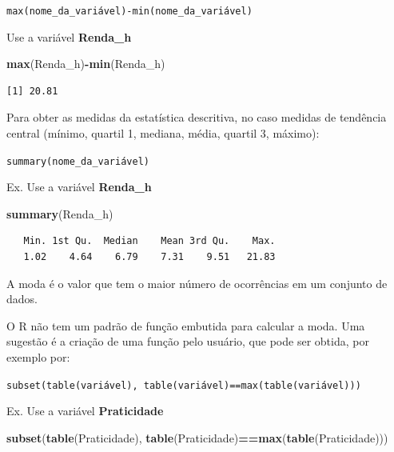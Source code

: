 \documentclass[12pt,brazil,oneside]{book}
\newenvironment{Shaded}{\begin{snugshade}}{\end{snugshade}}
\newcommand{\KeywordTok}[1]{\textcolor[rgb]{0.13,0.29,0.53}{\textbf{#1}}}
\newcommand{\NormalTok}[1]{#1}
\newcommand{\OperatorTok}[1]{\textcolor[rgb]{0.81,0.36,0.00}{\textbf{#1}}}
\begin{document}
\texttt{max(nome\_da\_variável)-min(nome\_da\_variável)}

Use a variável \textbf{Renda\_h}

\begin{Shaded}
\begin{Highlighting}[]
\KeywordTok{max}\NormalTok{(Renda_h)}\OperatorTok{-}\KeywordTok{min}\NormalTok{(Renda_h)}
\end{Highlighting}
\end{Shaded}

\begin{verbatim}
[1] 20.81
\end{verbatim}

Para obter as medidas da estatística descritiva, no caso medidas de tendência central (mínimo, quartil 1, mediana, média, quartil 3, máximo):

\texttt{summary(nome\_da\_variável)}

Ex. Use a variável \textbf{Renda\_h}

\begin{Shaded}
\begin{Highlighting}[]
\KeywordTok{summary}\NormalTok{(Renda_h)}
\end{Highlighting}
\end{Shaded}

\begin{verbatim}
   Min. 1st Qu.  Median    Mean 3rd Qu.    Max. 
   1.02    4.64    6.79    7.31    9.51   21.83 
\end{verbatim}

A moda é o valor que tem o maior número de ocorrências em um conjunto de dados.

O R não tem um padrão de função embutida para calcular a moda. Uma sugestão é a criação de uma função pelo usuário, que pode ser obtida, por exemplo por:

\texttt{subset(table(variável),\ table(variável)==max(table(variável)))}

Ex. Use a variável \textbf{Praticidade}

\begin{Shaded}
\begin{Highlighting}[]
\KeywordTok{subset}\NormalTok{(}\KeywordTok{table}\NormalTok{(Praticidade), }
       \KeywordTok{table}\NormalTok{(Praticidade)}\OperatorTok{==}\KeywordTok{max}\NormalTok{(}\KeywordTok{table}\NormalTok{(Praticidade)))}
\end{Highlighting}
\end{Shaded}
\end{document}
